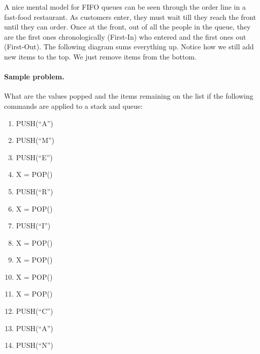 \documentclass{pset_template}
\begin{document}
A nice mental model for FIFO queues can be seen through the order line
in a fast-food restaurant.
As customers enter, they must wait till they reach the front until they can order.
Once at the front, out of all the people in the queue,
they are the first ones chronologically (First-In) who entered
and the first ones out (First-Out).
The following diagram sums everything up.
Notice how we still add new items to the top.
We just remove items from the bottom.
\begin{center}
\end{center}

\paragraph{Sample problem.} What are the values popped and the items remaining
on the list if the following commands are applied to a stack and queue:
\begin{multicols}{4}
\begin{enumerate}
\item PUSH(``A'')
\item PUSH(``M'')
\item PUSH(``E'')
\item X = POP()
\item PUSH(``R'')
\item X = POP()
\item PUSH(``I'')
\item X = POP()
\item X = POP()
\item X = POP()
\item X = POP()
\item PUSH(``C'')
\item PUSH(``A'')
\item PUSH(``N'')
\end{enumerate}
\end{multicols}
\end{document}
